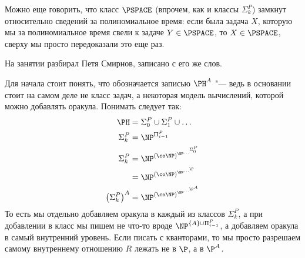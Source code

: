 	\begin{Rem}
		Можно еще говорить, что класс $\PSPACE$ (впрочем, как и классы $\Sigma_k^P$) замкнут относительно сведений за полиномиальное время:
		если была задача $X$, которую мы за полиномиальное время свели к задаче $Y\in \PSPACE$, то $X \in \PSPACE$, сверху мы просто
		передоказали это еще раз.
	\end{Rem}

	На занятии разбирал Петя Смирнов, записано с его же слов.

	\begin{Rem}
		Для начала стоит понять, что обозначается записью $\PH^A$ "--- ведь в основании стоит на самом деле не класс задач, а некоторая
		модель вычислений, которой можно добавлять оракула.
		Понимать следует так:
		\begin{align*}
			\PH &= \Sigma_0^P \cup \Sigma_1^P \cup \dots \\
			\Sigma_k^P &= \NP^{\Pi_{i-1}^P} \\
			\Sigma_k^P
				&= \NP^{(\co\NP)^{\NP^{\dots^{\Sigma_0^P}}}} \\
				&= \NP^{(\co\NP)^{\NP^{\dots^{\P}}}} \\
			\left(\Sigma_k^P\right)^A
				&= \NP^{(\co\NP)^{\NP^{\dots^{\P^A}}}}
		\end{align*}
		То есть мы отдельно добавляем оракула в каждый из классов $\Sigma_k^P$, а при добавлении в класс мы пишем не
		что-то вроде $\NP^{\{A\}\cup \Pi_{i-1}^P}$, а добавляем оракула в самый внутренний уровень.
		Если писать с кванторами, то мы просто разрешаем самому внутреннему отношению $R$ лежать не в $\P$, а в $\P^A$.
	\end{Rem}

